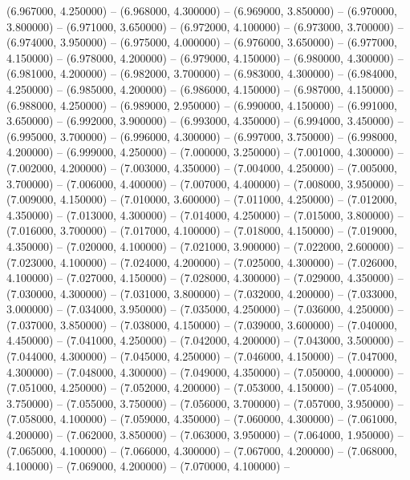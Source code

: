 (6.967000, 4.250000) -- 
(6.968000, 4.300000) -- 
(6.969000, 3.850000) -- 
(6.970000, 3.800000) -- 
(6.971000, 3.650000) -- 
(6.972000, 4.100000) -- 
(6.973000, 3.700000) -- 
(6.974000, 3.950000) -- 
(6.975000, 4.000000) -- 
(6.976000, 3.650000) -- 
(6.977000, 4.150000) -- 
(6.978000, 4.200000) -- 
(6.979000, 4.150000) -- 
(6.980000, 4.300000) -- 
(6.981000, 4.200000) -- 
(6.982000, 3.700000) -- 
(6.983000, 4.300000) -- 
(6.984000, 4.250000) -- 
(6.985000, 4.200000) -- 
(6.986000, 4.150000) -- 
(6.987000, 4.150000) -- 
(6.988000, 4.250000) -- 
(6.989000, 2.950000) -- 
(6.990000, 4.150000) -- 
(6.991000, 3.650000) -- 
(6.992000, 3.900000) -- 
(6.993000, 4.350000) -- 
(6.994000, 3.450000) -- 
(6.995000, 3.700000) -- 
(6.996000, 4.300000) -- 
(6.997000, 3.750000) -- 
(6.998000, 4.200000) -- 
(6.999000, 4.250000) -- 
(7.000000, 3.250000) -- 
(7.001000, 4.300000) -- 
(7.002000, 4.200000) -- 
(7.003000, 4.350000) -- 
(7.004000, 4.250000) -- 
(7.005000, 3.700000) -- 
(7.006000, 4.400000) -- 
(7.007000, 4.400000) -- 
(7.008000, 3.950000) -- 
(7.009000, 4.150000) -- 
(7.010000, 3.600000) -- 
(7.011000, 4.250000) -- 
(7.012000, 4.350000) -- 
(7.013000, 4.300000) -- 
(7.014000, 4.250000) -- 
(7.015000, 3.800000) -- 
(7.016000, 3.700000) -- 
(7.017000, 4.100000) -- 
(7.018000, 4.150000) -- 
(7.019000, 4.350000) -- 
(7.020000, 4.100000) -- 
(7.021000, 3.900000) -- 
(7.022000, 2.600000) -- 
(7.023000, 4.100000) -- 
(7.024000, 4.200000) -- 
(7.025000, 4.300000) -- 
(7.026000, 4.100000) -- 
(7.027000, 4.150000) -- 
(7.028000, 4.300000) -- 
(7.029000, 4.350000) -- 
(7.030000, 4.300000) -- 
(7.031000, 3.800000) -- 
(7.032000, 4.200000) -- 
(7.033000, 3.000000) -- 
(7.034000, 3.950000) -- 
(7.035000, 4.250000) -- 
(7.036000, 4.250000) -- 
(7.037000, 3.850000) -- 
(7.038000, 4.150000) -- 
(7.039000, 3.600000) -- 
(7.040000, 4.450000) -- 
(7.041000, 4.250000) -- 
(7.042000, 4.200000) -- 
(7.043000, 3.500000) -- 
(7.044000, 4.300000) -- 
(7.045000, 4.250000) -- 
(7.046000, 4.150000) -- 
(7.047000, 4.300000) -- 
(7.048000, 4.300000) -- 
(7.049000, 4.350000) -- 
(7.050000, 4.000000) -- 
(7.051000, 4.250000) -- 
(7.052000, 4.200000) -- 
(7.053000, 4.150000) -- 
(7.054000, 3.750000) -- 
(7.055000, 3.750000) -- 
(7.056000, 3.700000) -- 
(7.057000, 3.950000) -- 
(7.058000, 4.100000) -- 
(7.059000, 4.350000) -- 
(7.060000, 4.300000) -- 
(7.061000, 4.200000) -- 
(7.062000, 3.850000) -- 
(7.063000, 3.950000) -- 
(7.064000, 1.950000) -- 
(7.065000, 4.100000) -- 
(7.066000, 4.300000) -- 
(7.067000, 4.200000) -- 
(7.068000, 4.100000) -- 
(7.069000, 4.200000) -- 
(7.070000, 4.100000) -- 
